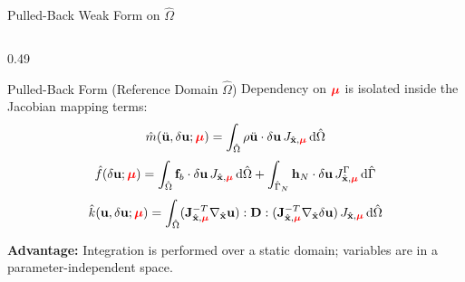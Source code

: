 \begin{frame}{Pulled-Back Weak Form on $\hat{\Omega}$}
\begin{columns}[T]
    \begin{column}{0.49\textwidth}
      \begin{block}{Pulled-Back Form (Reference Domain $\hat{\Omega}$)}
        \footnotesize
        Dependency on $\textcolor{red}{\boldsymbol{\mu}}$ is isolated inside the Jacobian mapping terms:
        \[
          \hat{m}(\ddot{\mathbf{u}},\delta\mathbf{u}; \textcolor{red}{\boldsymbol{\mu}}) = \int_{\hat{\Omega}} \rho \ddot{\mathbf{u}} \cdot \delta\mathbf{u}\, J_{\hat{\mathbf{x}}, \textcolor{red}{\boldsymbol{\mu}}} \,\mathrm{d}\hat{\Omega}
        \]
        \[
          \hat{f}(\delta\mathbf{u}; \textcolor{red}{\boldsymbol{\mu}}) = \int_{\hat{\Omega}} \mathbf{f}_b \cdot \delta\mathbf{u}\, J_{\hat{\mathbf{x}}, \textcolor{red}{\boldsymbol{\mu}}} \,\mathrm{d}\hat{\Omega} + \int_{\hat{\Gamma}_N} \mathbf{h}_N \cdot \delta\mathbf{u}\, J_{\hat{\mathbf{x}}, \textcolor{red}{\boldsymbol{\mu}}}^{\Gamma} \,\mathrm{d}\hat{\Gamma}
        \]
        \[
          \hat{k}(\mathbf{u},\delta\mathbf{u}; \textcolor{red}{\boldsymbol{\mu}}) = \int_{\hat{\Omega}} (\mathbf{J}_{\hat{\mathbf{x}}, \textcolor{red}{\boldsymbol{\mu}}}^{-T}\nabla_{\hat{\mathbf{x}}}\mathbf{u}):\mathbf{D}:(\mathbf{J}_{\hat{\mathbf{x}}, \textcolor{red}{\boldsymbol{\mu}}}^{-T}\nabla_{\hat{\mathbf{x}}}\delta\mathbf{u})\,J_{\hat{\mathbf{x}}, \textcolor{red}{\boldsymbol{\mu}}}\,\mathrm{d}\hat{\Omega}
        \]
        \par\vspace{0.1cm}
        \textbf{Advantage:}
        Integration is performed over a static domain; variables are in a parameter-independent space.
      \end{block}
    \end{column}
  \end{columns}
\end{frame}


